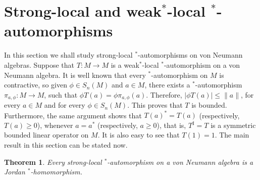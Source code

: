 \documentclass[11pt]{amsart}
\newtheorem{theorem}{Theorem}[section]
\begin{document}
\section{Strong-local and weak$^*$-local $^*$-automorphisms}\label{sec: strong-local automorphims on von Neumann algebras}

In this section we shall study strong-local $^*$-automorphisms on von Neumann algebras. Suppose that $T: M\to M$ is a weak$^*$-local $^*$-automorphism on a von Neumann algebra. It is well known that every $^*$-automorphism on $M$ is contractive, so given $\phi\in S_n (M)$ and $a\in M$, there exists a  $^*$-automorphism $\pi_{a,\phi} : M\to M$, such that $\phi T(a) = \phi \pi_{a,\phi} (a)$. Therefore, $|\phi T(a)|\leq \|a\|$, for every $a\in M$ and for every $\phi\in S_n (M)$. This proves that $T$ is bounded. Furthermore, the same argument shows that $T(a)^* = T(a)$ (respectively, $T(a)\geq 0$), whenever $a=a^*$ (respectively, $a\geq 0$), that is, $T^{\sharp} = T$ is a symmetric bounded linear operator on $M$. It is also easy to see that $T(1) = 1$. The main result in this section can be stated now.

\begin{theorem}\label{t strong$^*$-local *-automorphisms} Every strong-local $^*$-automorphism on a von Neumann algebra is a Jordan $^*$-homomorphism.
\end{theorem}
\end{document}
